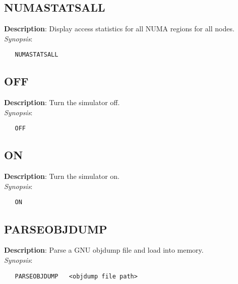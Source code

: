 \subsection{\bf NUMASTATSALL}
\label{manpages:NUMASTATSALL}
\label{manpages:numastatsall}
\vspace{-0.2in}
{\bf Description}: 	Display access statistics for all NUMA regions for all nodes.\\[1.5ex]
{\em Synopsis}:
\vspace{-0.2in}
\scriptsize
\begin{verbatim}
   NUMASTATSALL    
\end{verbatim}
\normalsize
\vspace{-0.2in}


\subsection{\bf OFF}
\label{manpages:OFF}
\label{manpages:off}
\vspace{-0.2in}
{\bf Description}: 	Turn the simulator off.\\[1.5ex]
{\em Synopsis}:
\vspace{-0.2in}
\scriptsize
\begin{verbatim}
   OFF   						
\end{verbatim}
\normalsize
\vspace{-0.2in}


\subsection{\bf ON}
\label{manpages:ON}
\label{manpages:on}
\vspace{-0.2in}
{\bf Description}: 	Turn the simulator on.\\[1.5ex]
{\em Synopsis}:
\vspace{-0.2in}
\scriptsize
\begin{verbatim}
   ON   						
\end{verbatim}
\normalsize
\vspace{-0.2in}


\subsection{\bf PARSEOBJDUMP}
\label{manpages:PARSEOBJDUMP}
\label{manpages:parseobjdump}
\vspace{-0.2in}
{\bf Description}: 	Parse a GNU objdump file and load into memory.\\[1.5ex]
{\em Synopsis}:
\vspace{-0.2in}
\scriptsize
\begin{verbatim}
   PARSEOBJDUMP   <objdump file path> 
\end{verbatim}
\normalsize
\vspace{-0.2in}


